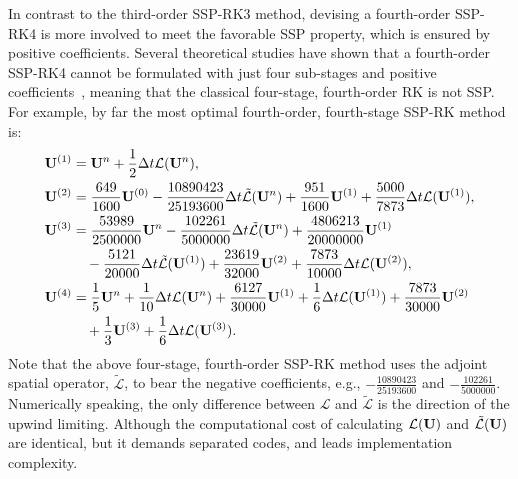 In contrast to the third-order SSP-RK3 method, devising a fourth-order SSP-RK4
is more involved to meet the favorable SSP property, which is ensured by positive coefficients.
Several theoretical studies have shown that a fourth-order SSP-RK4
cannot be formulated with just four sub-stages and positive coefficients~\cite{gottlieb1998total},
meaning that the classical four-stage, fourth-order RK is not SSP\@.
For example, by far the most optimal fourth-order, fourth-stage SSP-RK method is:
\begin{equation}\label{eq:ssp_rk44_negatives}
    \begin{split}
        \mathbf{U}^{(1)} &= \mathbf{U}^{n} + \frac{1}{2} \Delta t \mathcal{L}(\mathbf{U}^{n}), \\
        \mathbf{U}^{(2)} &= \frac{649}{1600} \mathbf{U}^{(0)} - \frac{10890423}{25193600} \Delta t \tilde{\mathcal{L}} (\mathbf{U}^{n}) + \frac{951}{1600} \mathbf{U}^{(1)} + \frac{5000}{7873} \Delta t \mathcal{L}(\mathbf{U}^{(1)}), \\
        \mathbf{U}^{(3)} &= \frac{53989}{2500000} \mathbf{U}^{n} - \frac{102261}{5000000} \Delta t \tilde{\mathcal{L}} (\mathbf{U}^{n}) + \frac{4806213}{20000000} \mathbf{U}^{(1)} \\
            &\quad - \frac{5121}{20000} \Delta t \tilde{\mathcal{L}}(\mathbf{U}^{(1)}) + \frac{23619}{32000} \mathbf{U}^{(2)} + \frac{7873}{10000} \Delta t \mathcal{L}(\mathbf{U}^{(2)}), \\
        \mathbf{U}^{(4)} &= \frac{1}{5} \mathbf{U}^{n} + \frac{1}{10} \Delta t \mathcal{L}(\mathbf{U}^{n}) + \frac{6127}{30000} \mathbf{U}^{(1)} + \frac{1}{6} \Delta t \mathcal{L}(\mathbf{U}^{(1)}) + \frac{7873}{30000} \mathbf{U}^{(2)} \\
            &\quad + \frac{1}{3} \mathbf{U}^{(3)} + \frac{1}{6} \Delta t \mathcal{L}(\mathbf{U}^{(3)}).
    \end{split}
\end{equation}
Note that the above four-stage, fourth-order SSP-RK method uses the adjoint spatial operator, \( \tilde{\mathcal{L}} \),
to bear the negative coefficients, e.g., \( -\frac{10890423}{25193600} \) and \( -\frac{102261}{5000000} \).
Numerically speaking, the only difference between \( \mathcal{L} \) and \( \tilde{\mathcal{L}} \)
is the direction of the upwind limiting. Although the computational cost of calculating \( \mathcal{L}(\mathbf{U}) \) and
\( \tilde{\mathcal{L}}(\mathbf{U}) \) are identical, but it demands separated codes, and leads implementation complexity.

